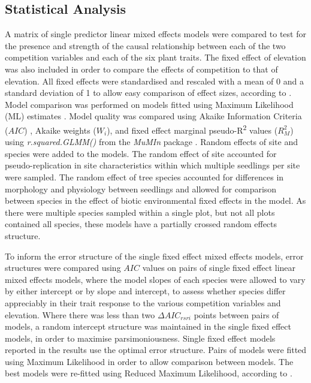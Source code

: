 \documentclass[a4paper, 11pt]{article}
\begin{document}



\subsection{Statistical Analysis}

A matrix of single predictor linear mixed effects models were compared to test for the presence and strength of the causal relationship between each of the two competition variables and each of the six plant traits. The fixed effect of elevation was also included in order to compare the effects of competition to that of elevation. All fixed effects were standardised and rescaled with a mean of 0 and a standard deviation of 1 to allow easy comparison of effect sizes, according to \citep{Grueber2011}. Model comparison was performed on models fitted using Maximum Likelihood (ML) estimates \citep{Bolker2008}. Model quality was compared using Akaike Information Criteria ($AIC$) \citep{Akaike1992}, Akaike weights ($W_i$), and fixed effect marginal pseudo-R\textsuperscript{2} values ($R_M^2$) using \textit{r.squared.GLMM()} from the \textit{MuMIn} package \citep{MuMIn}. Random effects of site and species were added to the models. The random effect of site accounted for pseudo-replication in site characteristics within which multiple seedlings per site were sampled. The random effect of tree species accounted for differences in morphology and physiology between seedlings and allowed for comparison between species in the effect of biotic environmental fixed effects in the model. As there were multiple species sampled within a single plot, but not all plots contained all species, these models have a partially crossed random effects structure.

To inform the error structure of the single fixed effect mixed effects models, error structures were compared using $AIC$ values on pairs of single fixed effect linear mixed effects models, where the model slopes of each species were allowed to vary by either intercept or by slope and intercept, to assess whether species differ appreciably in their trait response to the various competition variables and elevation. Where there was less than two $\Delta{}AIC_{rsri}$ points between pairs of models, a random intercept structure was maintained in the single fixed effect models, in order to maximise parsimoniousness. Single fixed effect models reported in the results use the optimal error structure. Pairs of models were fitted using Maximum Likelihood in order to allow comparison between models. The best models were re-fitted using Reduced Maximum Likelihood, according to \citet{Bolker2008}.
\end{document}
